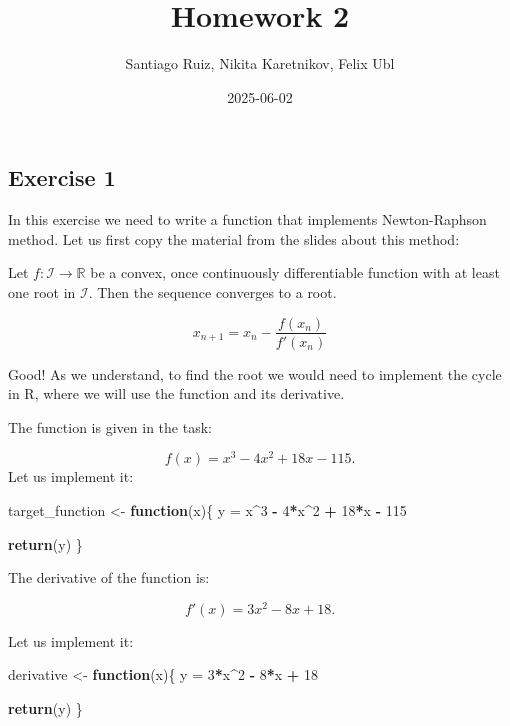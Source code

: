 \documentclass[
]{article}
\title{\textbf{Homework 2}}
\author{Santiago Ruiz, Nikita Karetnikov, Felix Ubl}
\date{2025-06-02}
\newenvironment{Shaded}{\begin{snugshade}}{\end{snugshade}}
\newcommand{\ControlFlowTok}[1]{\textcolor[rgb]{0.13,0.29,0.53}{\textbf{#1}}}
\newcommand{\DecValTok}[1]{\textcolor[rgb]{0.00,0.00,0.81}{#1}}
\newcommand{\FunctionTok}[1]{\textcolor[rgb]{0.13,0.29,0.53}{\textbf{#1}}}
\newcommand{\NormalTok}[1]{#1}
\newcommand{\OtherTok}[1]{\textcolor[rgb]{0.56,0.35,0.01}{#1}}
\newcommand{\SpecialCharTok}[1]{\textcolor[rgb]{0.81,0.36,0.00}{\textbf{#1}}}
\begin{document}
\maketitle

\subsection{Exercise 1}\label{exercise-1}

In this exercise we need to write a function that implements
Newton-Raphson method. Let us first copy the material from the slides
about this method:

Let \(f : \mathcal{I} \to \mathbb{R}\) be a convex, once continuously
differentiable function with at least one root in \(\mathcal{I}\). Then
the sequence converges to a root.

\[
x_{n+1} = x_n - \frac{f(x_n)}{f'(x_n)}
\]

Good! As we understand, to find the root we would need to implement the
cycle in R, where we will use the function and its derivative.

The function is given in the task:

\[
f(x) = x^3 - 4x^2 + 18x - 115.
\] Let us implement it:

\begin{Shaded}
\begin{Highlighting}[]
\NormalTok{target\_function }\OtherTok{\textless{}{-}} \ControlFlowTok{function}\NormalTok{(x)\{}
\NormalTok{  y }\OtherTok{=}\NormalTok{ x}\SpecialCharTok{\^{}}\DecValTok{3} \SpecialCharTok{{-}} \DecValTok{4}\SpecialCharTok{*}\NormalTok{x}\SpecialCharTok{\^{}}\DecValTok{2} \SpecialCharTok{+} \DecValTok{18}\SpecialCharTok{*}\NormalTok{x }\SpecialCharTok{{-}} \DecValTok{115}

  \FunctionTok{return}\NormalTok{(y)    }
\NormalTok{\}}
\end{Highlighting}
\end{Shaded}

The derivative of the function is:

\[
f'(x) = 3x^2 - 8x + 18.
\]

Let us implement it:

\begin{Shaded}
\begin{Highlighting}[]
\NormalTok{derivative }\OtherTok{\textless{}{-}} \ControlFlowTok{function}\NormalTok{(x)\{}
\NormalTok{  y }\OtherTok{=} \DecValTok{3}\SpecialCharTok{*}\NormalTok{x}\SpecialCharTok{\^{}}\DecValTok{2} \SpecialCharTok{{-}} \DecValTok{8}\SpecialCharTok{*}\NormalTok{x }\SpecialCharTok{+} \DecValTok{18}

  \FunctionTok{return}\NormalTok{(y)    }
\NormalTok{\}}
\end{Highlighting}
\end{Shaded}
\end{document}
